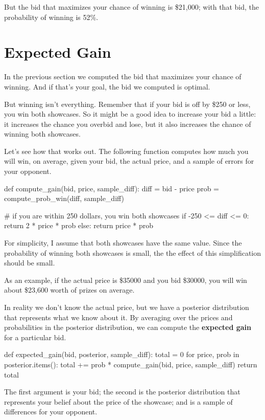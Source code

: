 \documentclass[12pt]{book}
\theoremstyle{exercise}
\begin{document}
But the bid that maximizes your chance of winning is \$21,000; with that bid, the probability of winning is 52\%.


\section{Expected Gain}

In the previous section we computed the bid that maximizes your chance of winning.
And if that's your goal, the bid we computed is optimal.

But winning isn't everything.
Remember that if your bid is off by \$250 or less, you win both showcases.
So it might be a good idea to increase your bid a little: it increases the chance you overbid and lose, but it also increases the chance of winning both showcases.

Let's see how that works out.
The following function computes how much you will win, on average, given your bid, the actual price, and a sample of errors for your opponent.

\begin{code}
def compute_gain(bid, price, sample_diff):
    diff = bid - price
    prob = compute_prob_win(diff, sample_diff)

    # if you are within 250 dollars, you win both showcases
    if -250 <= diff <= 0:
        return 2 * price * prob
    else:
        return price * prob
\end{code}

For simplicity, I assume that both showcases have the same value.
Since the probability of winning both showcases is small, the the effect of this simplification should be small.

As an example, if the actual price is \$35000 
and you bid \$30000, 
you will win about \$23,600 worth of prizes on average.

In reality we don't know the actual price, but we have a posterior distribution that represents what we know about it.
By averaging over the prices and probabilities in the posterior distribution, we can compute the {\bf expected gain} for a particular bid.

\begin{code}
def expected_gain(bid, posterior, sample_diff):
    total = 0
    for price, prob in posterior.items():
        total += prob * compute_gain(bid, price, sample_diff)
    return total
\end{code}

The first argument is your bid; the second is the posterior distribution that represents your belief about the price of the showcase; and  is a sample of differences for your opponent.
\end{document}
